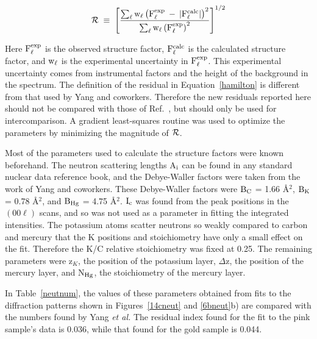 \begin{equation}
\label{hamilton}
 \cal R \rm \; \equiv \; \left[  \frac{\sum_{\ell} w_{\ell} \left( F_{\ell}^{exp} \: - \: |F_{\ell}^{calc}| \right)^2}{\sum_{\ell} w_{\ell} \left(F_{\ell}^{exp} \right)^2} \right]^{1/2}
\end{equation}


\noindent Here $\rm F_{\ell}^{exp}$ is the observed structure factor, $\rm
F_{\ell}^{calc}$ is the calculated structure  factor, and $\rm w_{\ell}$ is
the experimental  uncertainty in $\rm  F_{\ell}^{exp}$.   This experimental
uncertainty   comes  from instrumental    factors  and  the height   of the
background   in the  spectrum.    The   definition   of  the  residual   in
Equation~\ref{hamilton} is  different     from  that  used   by  Yang   and
coworkers.\cite{yang84}  Therefore the new  residuals reported  here should
not be compared with those of  Ref.~\cite{yang84}, but should only  be used
for  intercomparison.   A  gradient least-squares routine\cite{bevington69}
was used  to optimize  the parameters by  minimizing the magnitude of $\cal
R$.

        Most of the parameters used to calculate the structure factors were
known beforehand.  The neutron scattering lengths A$\rm _i$ can be found in
any standard   nuclear data  reference  book,\cite{mughabghab73}   and  the
Debye-Waller    factors were   taken    from   the   work   of   Yang   and
coworkers.\cite{yang84} These  Debye-Waller factors  were $\rm B_C$  = 1.66
\AA$^2$, $\rm B_K$ = 0.78
\AA$^2$, and $\rm B_{Hg}$ = 4.75 \AA$^2$. $\rm I_c$ was found from the peak
positions in the  $(00\ell)$ scans, and so was  not used as a parameter  in
fitting the integrated intensities.   The potassium atoms scatter  neutrons
so  weakly  compared to  carbon  and   mercury  that  the K positions   and
stoichiometry have only a  small   effect on   the fit.  Therefore  the K/C
relative stoichiometry was  fixed at 0.25.  The remaining  parameters  were
z$_K$, the position of the potassium layer, $\Delta$z,  the position of the
mercury layer, and N$\rm _{Hg}$, the stoichiometry of the mercury layer.

        In  Table~\ref{neutnum},  the values  of these parameters  obtained
from fits to  the diffraction patterns  shown in Figures~\ref{14cneut}  and
\ref{6bneut}b)  are  compared  with   the  numbers found  by  Yang  {\em   et
al.\/}\cite{yang84} The   residual index  found for the    fit to the  pink
sample's data is  0.036, while that found for  the gold sample is 0.044. 

